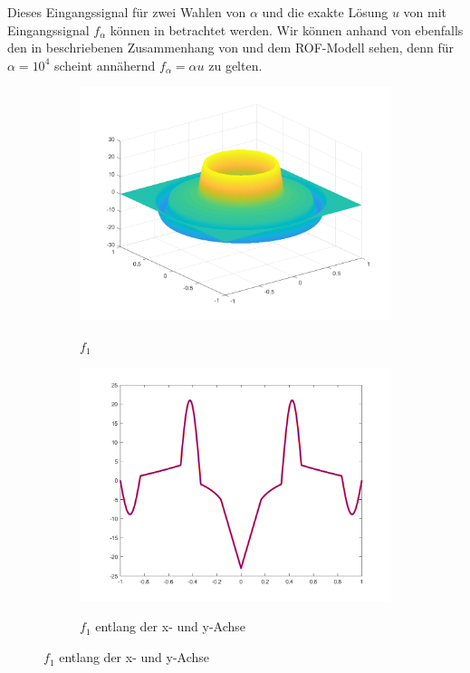 Dieses Eingangssignal für zwei Wahlen von $\alpha$ und die exakte Lösung $u$
von  mit Eingangssignal $f_\alpha$ können in
 betrachtet werden.
Wir können anhand von  ebenfalls den in
 beschriebenen Zusammenhang von
 und dem ROF-Modell sehen, denn für $\alpha=10^4$
scheint annähernd $f_\alpha=\alpha u$ zu gelten.
\begin{figure}[p]
  \centering
  \begin{subfigure}[b]{.48\linewidth}
    \centering
    \caption{$f_1$}
    \includegraphics[trim = 40 30 30 30, clip, width=\linewidth]
      {pictures/chapExperiments/secGeneralInfo/f01Plots/inSi1.png}
    \label{fig:f01InSi}
  \end{subfigure}
  \quad
  \begin{subfigure}[b]{.48\linewidth}
    \centering
    \caption{$f_1$ entlang der x- und y-Achse}
    \includegraphics[trim = 50 30 50 20, clip, width=\linewidth]
      {pictures/chapExperiments/secGeneralInfo/f01Plots/inSi1Axis.png}
    \label{fig:f01InSiAxis}
  \end{subfigure}


\end{figure}
